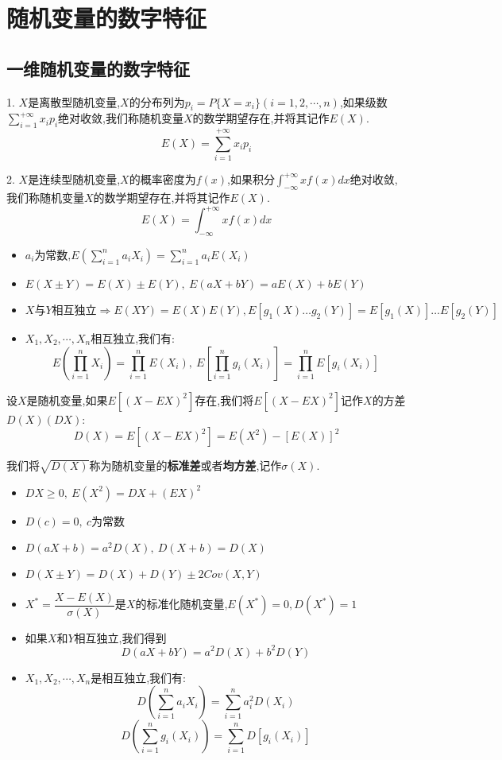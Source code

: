 \chapter{随机变量的数字特征}
\section{一维随机变量的数字特征}
\begin{definition}[数学期望]
		1. $X$是离散型随机变量,$X$的分布列为$p_{i}=P\{X=x_{i}\}(i=1,2,\cdots,n)$,如果级数$\sum\limits_{i=1}^{+\infty}x_{i}p_{i}$绝对收敛,我们称随机变量$X$的数学期望存在,并将其记作$E(X)$.
	$$E(X)=\sum\limits_{i=1}^{+\infty}x_{i}p_{i}$$
	
	2. $X$是连续型随机变量,$X$的概率密度为$f(x)$,如果积分$\int_{-\infty}^{+\infty}xf(x)dx$绝对收敛,我们称随机变量$X$的数学期望存在,并将其记作$E(X)$.
	$$E(X)=\int_{-\infty}^{+\infty}xf(x)dx$$
	\begin{itemize}
		\item  $a_{i}\text{为常数,}E\left(\sum\limits_{i=1}^{n}a_{i}X_{i} \right)=\sum\limits_{i=1}^{n}a_{i}E(X_{i}) $
		\item $E(X\pm Y)=E(X)\pm E(Y),\ E(aX+bY)=aE(X)+bE(Y)$
		\item $X\text{与}Y\text{相互独立}\Rightarrow E(XY)=E(X)E(Y),E\left[g_{1}(X)\dots g_{2}(Y) \right]=E\left[g_{1}(X)\right]\dots E\left[g_{2}(Y) \right] $
		\item $X_{1},X_{2},\cdots,X_{n}$相互独立,我们有: 
		$$E\left( \prod\limits_{i=1}^{n}X_{i}\right)=\prod\limits_{i=1}^{n}E(X_{i}),\ E\left[\prod\limits_{i=1}^{n}g_{i}(X_{i}) \right]=\prod\limits_{i=1}^{n}E\left[g_{i}(X_{i}) \right]   $$
	\end{itemize}
\end{definition}
\begin{definition}[方差和标准差]
	设$X$是随机变量,如果$E[(X-EX)^2]$存在,我们将$E[(X-EX)^2]$记作$X$的方差$D(X)(DX)$: 
	$$D(X)=E[(X-EX)^2]=E(X^2)-[E(X)]^2$$
	
	我们将$\sqrt{D(X)}$称为随机变量的\textbf{标准差}或者\textbf{均方差},记作$\sigma(X)$.
	\begin{itemize}
		\item $DX\geq 0,\ E(X^2)=DX+(EX)^2$
		\item $D(c)=0,\ c\text{为常数}$
		\item $D(aX+b)=a^2D(X),\ D(X+b)=D(X)$ 
		\item $D(X\pm Y)=D(X)+D(Y)\pm 2Cov(X,Y)$
		\item $X^{*}=\dfrac{X-E(X)}{\sigma(X)}$是$X$的标准化随机变量,$E(X^{*})=0,D(X^{*})=1$
		\item $\text{如果}X\text{和}Y\text{相互独立,我们得到}$
		$$D(aX+bY)=a^2D(X)+b^2D(Y)$$
		\item $X_{1},X_{2},\cdots,X_{n}$是相互独立,我们有: 
		$$D\left( \sum\limits_{i=1}^{n}a_{i}X_{i}\right)=\sum\limits_{i=1}^{n}a_{i}^2D(X_{i})$$
		$$D\left( \sum\limits_{i=1}^{n}g_{i}(X_{i})\right)=\sum\limits_{i=1}^{n}D\left[ g_{i}(X_{i})\right]  $$
	\end{itemize}
\end{definition}
